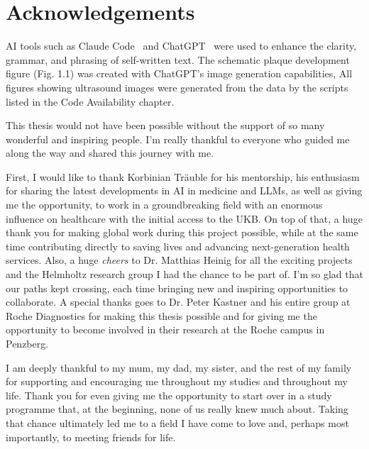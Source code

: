 \chapter*{Acknowledgements}

AI tools such as Claude Code~\cite{anthropic_claude_code} and ChatGPT~\cite{openai_chatgpt} were used to enhance the clarity, grammar, and phrasing of self-written text. The schematic plaque development figure (Fig. 1.1) was created with ChatGPT’s image generation capabilities, All figures showing ultrasound images were generated from the data by the scripts listed in the Code Availability chapter.

This thesis would not have been possible without the support of so many wonderful and inspiring people. I’m really thankful to everyone who guided me along the way and shared this journey with me.

First, I would like to thank Korbinian Träuble for his mentorship, his enthusiasm for sharing the latest developments in \ac{AI} in medicine and \acp{LLM}, as well as giving me the opportunity, to work in a groundbreaking field with an enormous influence on healthcare with the initial access to the \ac{UKB}. On top of that, a huge thank you for making global work during this project possible, while at the same time contributing directly to saving lives and advancing next-generation health services.
Also, a huge \textit{cheers} to Dr. Matthias Heinig for all the exciting projects and the Helmholtz research group I had the chance to be part of. I’m so glad that our paths kept crossing, each time bringing new and inspiring opportunities to collaborate.
A special thanks goes to Dr. Peter Kastner and his entire group at Roche Diagnostics for making this thesis possible and for giving me the opportunity to become involved in their research at the Roche campus in Penzberg.

I am deeply thankful to my mum, my dad, my sister, and the rest of my family for supporting and encouraging me throughout my studies and throughout my life. Thank you for even giving me the opportunity to start over in a study programme that, at the beginning, none of us really knew much about. Taking that chance ultimately led me to a field I have come to love and, perhaps most importantly, to meeting friends for life.